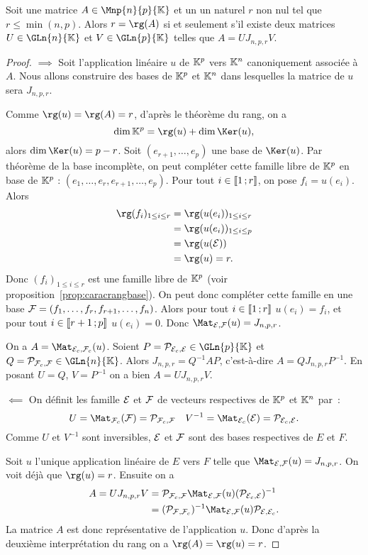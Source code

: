 \begin{theo}
  Soit une matrice $A \in \Mnp{n}{p}{\K}$ et un un naturel $r$ non nul tel que $r \leq \min(n,p)$. Alors $r=\rg(A)$ si et seulement s'il existe deux matrices $U \in \GLn{n}{\K}$ et $V \in \GLn{p}{\K}$ telles que $A=UJ_{n,p,r}V$.
\end{theo}
\begin{proof}
  $\implies$ Soit l'application linéaire $u$ de $\mathbb{K}^p$ vers $\mathbb{K}^n$ canoniquement associée à $A$. Nous allons construire des bases de $\mathbb{K}^p$ et $\mathbb{K}^n$ dans lesquelles la matrice de $u$ sera $J_{n,p,r}$. 
  
  Comme $\rg(u)=\rg(A)=r$, d'après le théorème du rang, on a
  \begin{equation}
    \dim \K^p = \rg(u)+\dim \Ker(u),
  \end{equation}
  alors $\dim \Ker(u) = p-r$. Soit $(e_{r+1}, \ldots, e_p)$ une base de $\Ker(u)$. Par théorème de la base incomplète, on peut compléter cette famille libre de $\mathbb{K}^p$ en base de $\mathbb{K}^p$ : $(e_1, \ldots, e_r, e_{r+1}, \ldots, e_p)$. Pour tout $i \in \mathopen{\llbracket}1\mathclose{}\mathpunct{};r\mathclose{\rrbracket}$, on pose $f_i = u(e_i)$. Alors
  \begin{align}
    \rg(f_i)_{1 \leq i \leq r} &= \rg(u(e_i))_{1 \leq i \leq r}\\
    &= \rg(u(e_i))_{1 \leq i \leq p}\\
    &= \rg(u(\E))\\
    &=\rg(u)=r.
  \end{align}
  Donc $(f_i)_{1\leq i\leq r}$ est une famille libre de $\mathbb{K}^p$ (voir proposition~\ref{prop:caracrangbase}). On peut donc compléter cette famille en une base $\mathcal{F}=(f_1, \ldots, f_r,f_{r+1}, \ldots, f_n)$. Alors pour tout $i \in \mathopen{\llbracket}1\mathclose{}\mathpunct{};r\mathclose{\rrbracket}$ $u(e_i)=f_i$, et pour tout $i \in \mathopen{\llbracket}r+1\mathclose{}\mathpunct{};p\mathclose{\rrbracket}$ $u(e_i)=0$. Donc $\Mat_{\E,\F}(u) = J_{n,p,r}$.

  On a $A=\Mat_{\E_c,\F_c}(u)$. Soient $P=\P_{\E_c,\E} \in \GLn{p}{\K}$ et $Q=\P_{\F_c,\F} \in \GLn{n}{\K}$. Alors $J_{n,p,r}=Q^{-1}AP$, c'est-à-dire $A=QJ_{n,p,r}P^{-1}$. En posant $U=Q$, $V=P^{-1}$ on a bien $A=U J_{n,p,r} V$.
  
  $\impliedby$  On définit les famille $\mathcal{E}$ et $\mathcal{F}$ de vecteurs respectives de $\mathbb{K}^p$ et $\mathbb{K}^n$ par~:
  \begin{equation}
    U=\Mat_{\F_c}(\F)=\P_{\F_c,\F} \quad V^{-1}=\Mat_{\E_c}(\E)=\P_{\E_c,\E}.
  \end{equation}
  Comme $U$ et $V^{-1}$ sont inversibles, $\mathcal{E}$ et $\mathcal{F}$ sont des bases respectives de $E$ et $F$. 

  Soit $u$ l'unique application linéaire de $E$ vers $F$ telle que $\Mat_{\E,\F}(u)=J_{n,p,r}$. On voit déjà que $\rg(u)=r$. Ensuite on a
  \begin{align}
    A = U J_{n,p,r} V &= \P_{\F_c,\F} \Mat_{\E,\F}(u) (\P_{\E_c,\E})^{-1} \\
    &=(\P_{\F,\F_c})^{-1} \Mat_{\E,\F}(u) \P_{\E,\E_c}.
  \end{align}
  La matrice $A$ est donc représentative de l'application $u$. Donc d'après la deuxième interprétation du rang on a $\rg(A)=\rg(u)=r$.
\end{proof}

